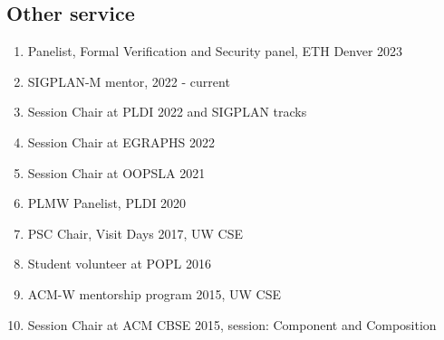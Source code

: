 \documentclass[margin, 10pt]{res} %
\begin{document}
\begin{resume}
\subsection{Other service}
\begin{enumerate}[itemsep=-2pt]
\item {Panelist, Formal Verification and Security panel, ETH Denver 2023}
\item SIGPLAN-M mentor, 2022 - current
\item Session Chair at PLDI 2022 and SIGPLAN tracks
\item Session Chair at EGRAPHS 2022
\item Session Chair at OOPSLA 2021
\item PLMW Panelist, PLDI 2020
\item PSC Chair, Visit Days 2017, UW CSE
\item Student volunteer at POPL 2016
\item ACM-W mentorship program 2015, UW CSE
\item Session Chair at ACM CBSE 2015, session: Component and Composition
\end{enumerate}


\end{resume}
\end{document}
